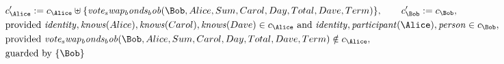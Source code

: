 \begin{align*}
&
c'_
{
\Alice
}
 := 
c_
{
\Alice
}
 \uplus 
\{
\mathit{
vote_swap_bonds_bob
}
(
\Bob
,
Alice
,
Sum
,
Carol
,
Day
,
Total
,
Dave
,
Term
)
\}
, \qquad 
c'_
{
\Bob
}
 := 
c_
{
\Bob
}
,\\
&
\text{provided } 
\mathit{
identity
}
,
\mathit{
knows
}
(
Alice
)
,
\mathit{
knows
}
(
Carol
)
,
\mathit{
knows
}
(
Dave
)
 \in c_
{
\Alice
}
 \text{ and } 
\mathit{
identity
}
,
\mathit{
participant
}
(
\Alice
)
,
\mathit{
person
}
 \in c_
{
\Bob
}
,\\
&
\text{provided } 
\mathit{
vote_swap_bonds_bob
}
(
\Bob
,
Alice
,
Sum
,
Carol
,
Day
,
Total
,
Dave
,
Term
)
 \notin c_
{
\Alice
}
,\\
&
\text{guarded by } \{
\Bob
\}
\end{align*}

